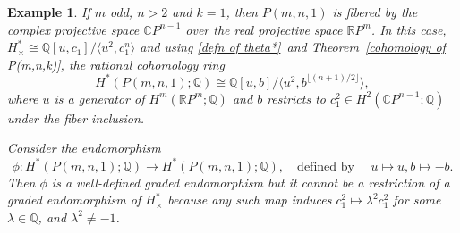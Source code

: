 \documentclass{amsart}
\newtheorem{example}[theorem]{Example}
\newcommand{\thmref}[1]{Theorem~\ref{#1}}
\begin{document}
	
	\begin{example}
		If $m$ odd, $n>2$ and $k = 1$, then $P(m,n,1)$ is fibered by the complex projective space  $\mathbb{C} P^{n-1}$ over the real projective space $\mathbb{R} P^m$. In this case,  $H^*_\times\cong \mathbb Q[u,c_1]/\langle u^2, c_1^n\rangle$ and using \eqref{defn of theta*}\ and \thmref{cohomology of P(m,n,k)}, the rational cohomology ring $$H^*(P(m,n,1); \mathbb{Q}) \cong \mathbb{Q}[u, b] / \langle u^2, b^{\lfloor (n+1)/2 \rfloor} \rangle,$$ where $u$ is a generator of $H^m(\mathbb{R}P^m;\mathbb Q)$ and $b$ restricts to $c_1^2\in H^2(\mathbb CP^{n-1};\mathbb Q)$ under the fiber inclusion. 
		
		Consider the endomorphism
		\[
		\phi \colon H^*(P(m,n,1); \mathbb{Q}) \to H^*(P(m,n,1); \mathbb{Q}), \quad \text{defined by }\quad u \mapsto u,  b \mapsto -b.
		\]
		Then $\phi$ is a well-defined graded endomorphism but it cannot be a restriction of a graded endomorphism of $H^*_\times$ because any such map induces $c_1^2 \mapsto \lambda^2 c_1^2$ for some $\lambda \in \mathbb{Q}$, and $\lambda^2 \neq -1$.
	\end{example}
	
\end{document}

